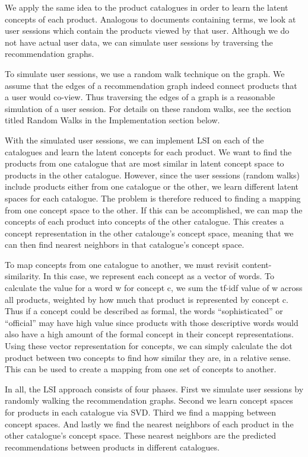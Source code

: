 \documentclass[11pt]{article}
\begin{document}
We apply the same idea to the product catalogues in order to learn the latent
concepts of each product. Analogous to documents containing terms, we look at
user sessions which contain the products viewed by that user. Although we do not
have actual user data, we can simulate user sessions by traversing the
recommendation graphs. 

To simulate user sessions, we use a random walk technique on the graph. We
assume that the edges of a recommendation graph indeed connect products that a user
would co-view. Thus traversing the edges of a graph is a reasonable simulation
of a user session. For details on these random walks, see the section titled
Random Walks in the Implementation section below.

With the simulated user sessions, we can implement LSI on each of the catalogues
and learn the latent concepts for each product. We want to find the products from
one catalogue that are most similar in latent concept space to products in the
other catalogue. However, since the user sessions (random walks) include
products either from one catalogue or the other, we learn different latent 
spaces for each catalogue. The problem is therefore reduced to finding a mapping
from one concept space to the other. If this can be accomplished, we
can map the concepts of each product into concepts of the other catalogue. This
creates a concept representation in the other catalouge's concept space, meaning
that we can then find nearest neighbors in that catalogue's concept space. 

To map concepts from one catalogue to another, we must revisit
content-similarity. In this case, we represent each concept as a vector of
words. To calculate the value for a word w for concept c, we sum the tf-idf
value of w across all products, weighted by how much that product is represented
by concept c. Thus if a concept could be described as formal, the words
``sophisticated'' or ``official'' may have high value since products with those
descriptive words would also have a high amount of the formal concept in their
concept representations. Using these vector representation for concepts, we can
simply calculate the dot product between two concepts to find how similar they
are, in a relative sense. This can be used to create a mapping from one set of
concepts to another.

In all, the LSI approach consists of four phases. First we simulate user
sessions by randomly walking the recommendation graphs. Second we learn concept
spaces for products in each catalogue via SVD. Third we find a mapping between
concept spaces. And lastly we find the nearest neighbors of each product in the
other catalogue's concept space. These nearest neighbors are the predicted
recommendations between products in different catalogues.
\end{document}
